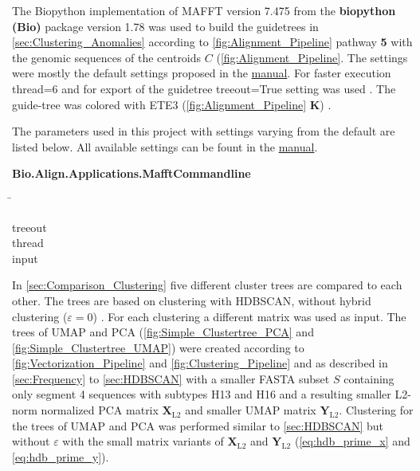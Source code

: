 The Biopython implementation of MAFFT version 7.475 from the \textbf{biopython (Bio)} package version 1.78 was used to build the guidetrees in \autoref{sec:Clustering_Anomalies} according to \autoref{fig:Alignment_Pipeline} pathway \textsf{\textbf{5}} with the genomic sequences of the centroids $C$ \autocite{katoh_mafft_2013, cock_biopython_2009} (\autoref{fig:Alignment_Pipeline}. The settings were mostly the default settings proposed in the \href{https://mafft.cbrc.jp/alignment/software/}{manual}. For faster execution \colorbox{backcolour}{thread=6} and for export of the guidetree \colorbox{backcolour}{treeout=True} setting was used \autocite{katoh_mafft_2013, cock_biopython_2009}. The guide-tree was colored with ETE3 (\autoref{fig:Alignment_Pipeline} \textsf{\textbf{K}}) \autocite{huerta-cepas_ete_2016}.

The parameters used in this project with settings varying from the default are listed below. All available settings can be fount in the \href{https://mafft.cbrc.jp/alignment/software/}{manual}.

\begin{leftbar}
    \textbf{Bio.Align.Applications.MafftCommandline}
    \begin{nstabbing}
        \qquad\qquad\qquad\qquad\qquad\quad\=\kill
    
        treeout \\
        
        thread \\
        
        input 
        
    \end{nstabbing}
\end{leftbar}

In \autoref{sec:Comparison_Clustering} five different cluster trees are compared to each other. The trees are based on clustering with \gls{HDBSCAN}, without hybrid clustering ($\varepsilon=0$) \autocite{malzer_hybrid_2020, mcinnes_hdbscan_2017}. For each clustering a different matrix was used as input. The trees of \gls{UMAP} and \gls{PCA} (\autoref{fig:Simple_Clustertree_PCA} and \autoref{fig:Simple_Clustertree_UMAP}) were created according to \autoref{fig:Vectorization_Pipeline} and \autoref{fig:Clustering_Pipeline} and as described in \autoref{sec:Frequency} to \autoref{sec:HDBSCAN} with a smaller FASTA subset $S$ containing only segment 4 sequences with subtypes H13 and H16 and a resulting smaller L2-norm normalized \gls{PCA} matrix $\mathbf{X}_{\text{L2}}$ and smaller \gls{UMAP} matrix $\mathbf{Y}_{\text{L2}}$. Clustering for the trees of \gls{UMAP} and \gls{PCA} was performed similar to \autoref{sec:HDBSCAN} but without $\varepsilon$ with the small matrix variants of $\mathbf{X}_{\text{L2}}$ and $\mathbf{Y}_{\text{L2}}$ (\autoref{eq:hdb_prime_x} and \autoref{eq:hdb_prime_y}). 

